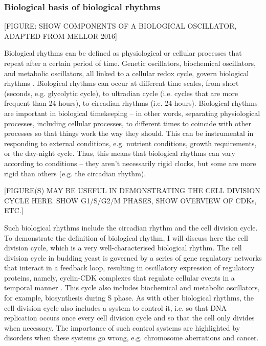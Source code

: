 \subsubsection{Biological basis of biological rhythms}
\label{subsubsec:intro-ymc-biological_rhythms-biological_basis}


[FIGURE: SHOW COMPONENTS OF A BIOLOGICAL OSCILLATOR, ADAPTED FROM MELLOR 2016]

Biological rhythms can be defined as physiological or cellular processes that repeat after a certain period of time.
Genetic oscillators, biochemical oscillators, and metabolic oscillators, all linked to a cellular redox cycle, govern biological rhythms \citep{mellorMolecularBasisMetabolic2016}.
Biological rhythms can occur at different time scales, from short (seconds, e.g. glycolytic cycle), to ultradian cycle (i.e. cycles that are more frequent than 24 hours), to circadian rhythms (i.e. 24 hours).
Biological rhythms are important in biological timekeeping -- in other words, separating physiological processes, including cellular processes, to different times to coincide with other processes so that things work the way they should.
This can be instrumental in responding to external conditions, e.g. nutrient conditions, growth requirements, or the day-night cycle.
Thus, this means that biological rhythms can vary according to conditions -- they aren't necessarily rigid clocks, but some are more rigid than others (e.g. the circadian rhythm).

[FIGURE(S) MAY BE USEFUL IN DEMONSTRATING THE CELL DIVISION CYCLE HERE.  SHOW G1/S/G2/M PHASES, SHOW OVERVIEW OF CDKs, ETC.]


Such biological rhythms include the circadian rhythm and the cell division cycle.
To demonstrate the definition of biological rhythm, I will discuss here the cell division cycle, which is a very well-characterised biological rhythm.
The cell division cycle in budding yeast is governed by a series of gene regulatory networks that interact in a feedback loop, resulting in oscillatory expression of regulatory proteins, namely, cyclin-CDK complexes that regulate cellular events in a temporal manner \citep{adlerYeastCellCycle2022, orlandoGlobalControlCellcycle2008, murrayRecyclingCellCycle2004}.
This cycle also includes biochemical and metabolic oscillators, for example, biosynthesis during S phase.
As with other biological rhythms, the cell division cycle also includes a system to control it, i.e. so that DNA replication occurs once every cell division cycle and so that the cell only divides when necessary.
The importance of such control systems are highlighted by disorders when these systems go wrong, e.g. chromosome aberrations and cancer.%

